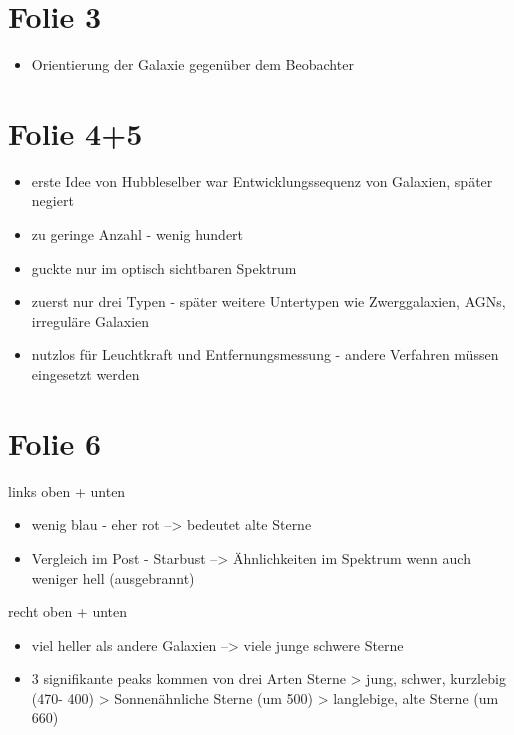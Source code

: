 





\section{Folie 3}


\begin{itemize}
\item Orientierung der Galaxie gegenüber dem Beobachter
\end{itemize}


\section{Folie 4+5}

\begin{itemize}
\item erste Idee von Hubbleselber war Entwicklungssequenz von Galaxien, später negiert
\item zu geringe Anzahl - wenig hundert
\item guckte nur im optisch sichtbaren Spektrum
\item zuerst nur drei Typen - später weitere Untertypen wie Zwerggalaxien, AGNs, irreguläre Galaxien
\item nutzlos für Leuchtkraft und Entfernungsmessung - andere Verfahren müssen eingesetzt werden
\end{itemize}


\section{Folie 6}

links oben + unten

\begin{itemize}
\item wenig blau - eher rot --> bedeutet alte Sterne
\item Vergleich im Post - Starbust --> Ähnlichkeiten im Spektrum wenn auch weniger hell (ausgebrannt)
\end{itemize}


recht oben + unten

\begin{itemize}
\item viel heller als andere Galaxien --> viele junge schwere Sterne
\item 3 signifikante peaks kommen von drei Arten Sterne
\subitem > jung, schwer, kurzlebig (470- 400)
\subitem > Sonnenähnliche Sterne (um 500)
\subitem > langlebige, alte Sterne (um 660)
\end{itemize}


